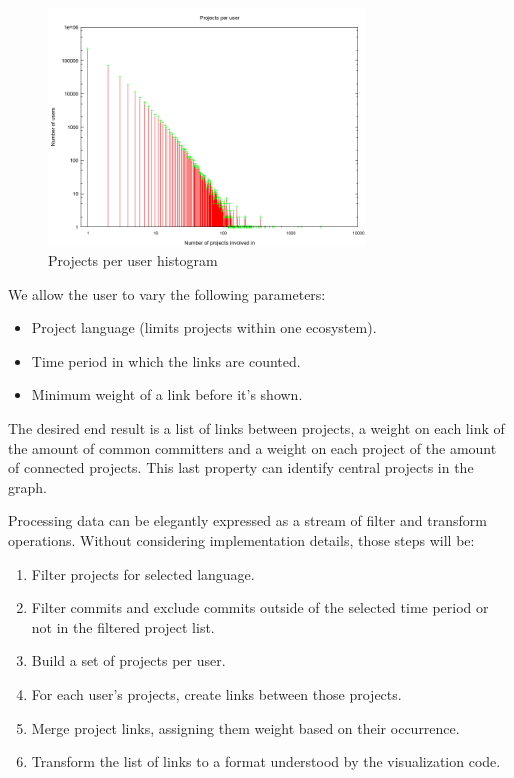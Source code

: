 \documentclass[10pt,a4paper]{article}
\begin{document}
\begin{figure}[htb]
    \centering
    \includegraphics[width=0.75\textwidth]{projects-per-user-histogram}
    \caption{Projects per user histogram}
    \label{fig:projects-per-user-hist}
\end{figure}

We allow the user to vary the following parameters:
\begin{itemize}
    \item Project language (limits projects within one ecosystem).
    \item Time period in which the links are counted.
    \item Minimum weight of a link before it's shown.
\end{itemize}
The desired end result is a list of links between projects, a weight on each link of the amount of common committers and a weight on each project of the amount of connected projects. This last property can identify central projects in the graph.

Processing data can be elegantly expressed as a stream of filter and transform operations. Without considering implementation details, those steps will be:
\begin{enumerate}
    \item Filter projects for selected language.
    \item Filter commits and exclude commits outside of the selected time period or not in the filtered project list.
    \item Build a set of projects per user.
    \item For each user's projects, create links between those projects.
    \item Merge project links, assigning them weight based on their occurrence.
    \item Transform the list of links to a format understood by the visualization code.
\end{enumerate}
\end{document}
